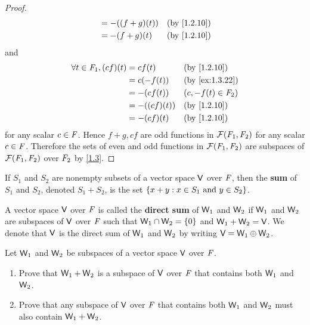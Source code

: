 \begin{proof}
\begin{align*}
		                               & = -((f + g)(t))  &  & \text{(by \cref{1.2.10})}    \\
		                               & = -(f + g)(t)    &  & \text{(by \cref{1.2.10})}
	\end{align*}
	and
	\begin{align*}
		\forall t \in \F_1, (cf)(t) & = cf(t)      &  & \text{(by \cref{1.2.10})}    \\
		                            & = c(-f(t))   &  & \text{(by \cref{ex:1.3.22})} \\
		                            & = -(cf(t))   &  & (c, -f(t) \in \F_2)          \\
		                            & = -((cf)(t)) &  & \text{(by \cref{1.2.10})}    \\
		                            & = -(cf)(t)   &  & \text{(by \cref{1.2.10})}
	\end{align*}
	for any scalar \(c \in \mathit{F}\).
	Hence \(f + g, cf\) are odd functions in \(\fs{\F_1}{\F_2}\) for any scalar \(c \in \mathit{F}\).
	Therefore the sets of even and odd functions in \(\fs{\F_1}{\F_2}\) are subspaces of \(\fs{\F_1}{\F_2}\) over \(\mathit{F}_2\) by \cref{1.3}.
\end{proof}

\begin{defn}\label{1.3.10}
	If \(S_1\) and \(S_2\) are nonempty subsets of a vector space \(\mathsf{V}\) over \(\mathit{F}\), then the \textbf{sum} of \(S_1\) and \(S_2\), denoted \(S_1 + S_2\), is the set \(\left\lbrace x + y : x \in S_1 \text{ and } y \in S_2\right\rbrace\).
\end{defn}

\begin{defn}\label{1.3.11}
	A vector space \(\mathsf{V}\) over \(\mathit{F}\) is called the \textbf{direct sum} of \(\mathsf{W}_1\) and \(\mathsf{W}_2\) if \(\mathsf{W}_1\) and \(\mathsf{W}_2\) are subspaces of \(\mathsf{V}\) over \(\mathit{F}\) such that \(\mathsf{W}_1 \cap \mathsf{W}_2 = \left\lbrace0\right\rbrace\) and \(\mathsf{W}_1 + \mathsf{W}_2 = \mathsf{V}\).
	We denote that \(\mathsf{V}\) is the direct sum of \(\mathsf{W}_1\) and \(\mathsf{W}_2\) by writing \(\mathsf{V} = \mathsf{W}_1 \oplus \mathsf{W}_2\).
\end{defn}

\begin{ex}\label{ex:1.3.23}
	Let \(\mathsf{W}_1\) and \(\mathsf{W}_2\) be subspaces of a vector space \(\mathsf{V}\) over \(\mathit{F}\).
	\begin{enumerate}
		\item Prove that \(\mathsf{W}_1 + \mathsf{W}_2\) is a subspace of \(\mathsf{V}\) over \(\mathit{F}\) that contains both \(\mathsf{W}_1\) and \(\mathsf{W}_2\).
		\item Prove that any subspace of \(\mathsf{V}\) over \(\mathit{F}\) that contains both \(\mathsf{W}_1\) and \(\mathsf{W}_2\) must also contain \(\mathsf{W}_1 + \mathsf{W}_2\).
	\end{enumerate}
\end{ex}

